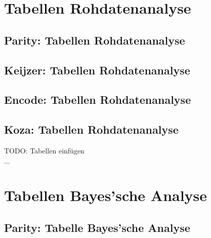 \section{Tabellen Rohdatenanalyse}
\label{sec:tablesRohdatenanalyseAppendix}

\subsection{Parity: Tabellen Rohdatenanalyse}

\subsection{Keijzer: Tabellen Rohdatenanalyse}

\subsection{Encode: Tabellen Rohdatenanalyse}

\subsection{Koza: Tabellen Rohdatenanalyse}
TODO: Tabellen einfügen\\
...

\section{Tabellen Bayes'sche Analyse}
\label{sec:appendixTabellenBayes}

\subsection{Parity: Tabelle Bayes'sche Analyse}
\label{subsec:appendixTabelleBayesParity}


